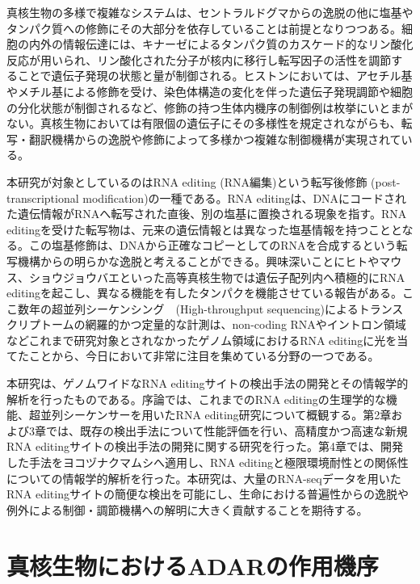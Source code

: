 \par
真核生物の多様で複雑なシステムは、セントラルドグマからの逸脱の他に塩基やタンパク質への修飾にその大部分を依存していることは前提となりつつある。細胞の内外の情報伝達には、キナーゼによるタンパク質のカスケード的なリン酸化反応が用いられ、リン酸化された分子が核内に移行し転写因子の活性を調節することで遺伝子発現の状態と量が制御される。ヒストンにおいては、アセチル基やメチル基による修飾を受け、染色体構造の変化を伴った遺伝子発現調節や細胞の分化状態が制御されるなど、修飾の持つ生体内機序の制御例は枚挙にいとまがない。真核生物においては有限個の遺伝子にその多様性を規定されながらも、転写・翻訳機構からの逸脱や修飾によって多様かつ複雑な制御機構が実現されている。
\par
本研究が対象としているのはRNA editing (RNA編集)という転写後修飾 (post-transcriptional modification)の一種である。RNA 
editingは、DNAにコードされた遺伝情報がRNAへ転写された直後、別の塩基に置換される現象を指す。RNA editingを受けた転写物は、元来の遺伝情報とは異なった塩基情報を持つこととなる。この塩基修飾は、DNAから正確なコピーとしてのRNAを合成するという転写機構からの明らかな逸脱と考えることができる。興味深いことにヒトやマウス、ショウジョウバエといった高等真核生物では遺伝子配列内へ積極的にRNA editingを起こし、異なる機能を有したタンパクを機能させている報告がある。ここ数年の超並列シーケンシング　(High-throughput sequencing)によるトランスクリプトームの網羅的かつ定量的な計測は、non-coding RNAやイントロン領域などこれまで研究対象とされなかったゲノム領域におけるRNA editingに光を当てたことから、今日において非常に注目を集めている分野の一つである。
\par
本研究は、ゲノムワイドなRNA editingサイトの検出手法の開発とその情報学的解析を行ったものである。序論では、これまでのRNA editingの生理学的な機能、超並列シーケンサーを用いたRNA editing研究について概観する。第2章および3章では、既存の検出手法について性能評価を行い、高精度かつ高速な新規RNA editingサイトの検出手法の開発に関する研究を行った。第4章では、開発した手法をヨコヅナクマムシへ適用し、RNA editingと極限環境耐性との関係性についての情報学的解析を行った。本研究は、大量のRNA-seqデータを用いたRNA editingサイトの簡便な検出を可能にし、生命における普遍性からの逸脱や例外による制御・調節機構への解明に大きく貢献することを期待する。
\newpage

\section{真核生物におけるADARの作用機序}
